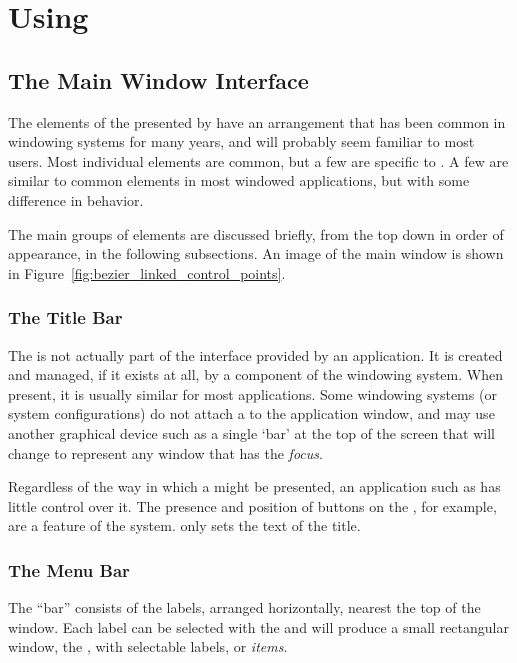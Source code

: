 \chapter{Using \dtypkgu{}}

	\section{The Main Window Interface}%
	The elements of the  presented by \IXpkg{}
	have an arrangement that has been common in
	windowing systems for many years, and will probably
	seem familiar to most users. Most individual elements are common,
	but a few are specific to \IXpkg{}. A few are similar
	to common elements in most windowed applications,
	but with some difference in behavior.

	The main groups of  elements are
	discussed briefly, from the top down in order of appearance,
	in the following subsections. An image of the main window
	is shown in Figure~\ref{fig:bezier_linked_control_points}.

		\subsection{The Title Bar}%
		The  is not actually part of
		the interface provided by an application. It is
		created and managed, if it exists at all, by a
		component of the windowing system. When present,
		it is usually similar for most applications. Some
		windowing systems (or system configurations) do not
		attach a  to the application window,
		and may use another graphical device such as a
		single `bar' at the top of the screen that will
		change to represent any window that has the \emph{focus}.
		
		Regardless of the way in which a 
		might be presented, an application such as \IXpkg{}
		has little control over it. The presence and position
		of buttons on the , for example,
		are a feature of the system. \IXpkgu{} only sets
		the text of the title.

		\subsection{The Menu Bar}%
		The  ``bar'' consists of the labels, arranged
		horizontally, nearest the top of the window. Each
		label can be selected with the  and
		will produce a small rectangular window, the
		, with selectable labels, or
		\emph{items}.
		
